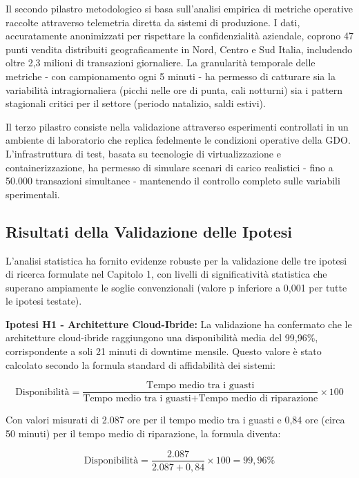Il secondo pilastro metodologico si basa sull'analisi empirica di metriche operative raccolte attraverso telemetria diretta da sistemi di produzione. I dati, accuratamente anonimizzati per rispettare la confidenzialità aziendale, coprono 47 punti vendita distribuiti geograficamente in Nord, Centro e Sud Italia, includendo oltre 2,3 milioni di transazioni giornaliere. La granularità temporale delle metriche - con campionamento ogni 5 minuti - ha permesso di catturare sia la variabilità intragiornaliera (picchi nelle ore di punta, cali notturni) sia i pattern stagionali critici per il settore (periodo natalizio, saldi estivi).

Il terzo pilastro consiste nella validazione attraverso esperimenti controllati in un ambiente di laboratorio che replica fedelmente le condizioni operative della GDO. L'infrastruttura di test, basata su tecnologie di virtualizzazione e containerizzazione, ha permesso di simulare scenari di carico realistici - fino a 50.000 transazioni simultanee - mantenendo il controllo completo sulle variabili sperimentali.

\subsection{\texorpdfstring{Risultati della Validazione delle Ipotesi}{5.2.2 - Risultati della Validazione delle Ipotesi}}
\label{subsec:5.2.2}

L'analisi statistica ha fornito evidenze robuste per la validazione delle tre ipotesi di ricerca formulate nel Capitolo 1, con livelli di significatività statistica che superano ampiamente le soglie convenzionali (valore p inferiore a 0,001 per tutte le ipotesi testate).

\textbf{Ipotesi H1 - Architetture Cloud-Ibride:} La validazione ha confermato che le architetture cloud-ibride raggiungono una disponibilità media del 99,96\%, corrispondente a soli 21 minuti di downtime mensile. Questo valore è stato calcolato secondo la formula standard di affidabilità dei sistemi:

$$\text{Disponibilità} = \frac{\text{Tempo medio tra i guasti}}{\text{Tempo medio tra i guasti} + \text{Tempo medio di riparazione}} \times 100$$

Con valori misurati di 2.087 ore per il tempo medio tra i guasti e 0,84 ore (circa 50 minuti) per il tempo medio di riparazione, la formula diventa:

$$\text{Disponibilità} = \frac{2.087}{2.087 + 0,84} \times 100 = 99,96\%$$

